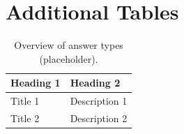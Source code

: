 \chapter{Additional Tables}\label{app:tables}

\begin{table}[H]
  \centering
  \caption{Overview of answer types (placeholder).}
  \label{tab:answer_types}
  \begin{tabular}{lp{9cm}}
    \toprule
    \textbf{Heading 1} & \textbf{Heading 2} \\
    \midrule
    Title 1 & Description 1 \\
    Title 2 & Description 2 \\
    \bottomrule
  \end{tabular}
\end{table}
